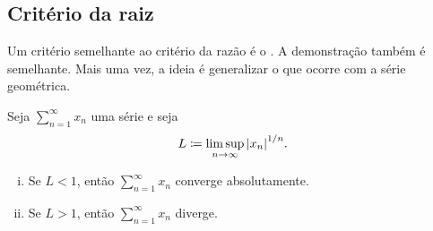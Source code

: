 

\subsection{Critério da raiz}

Um critério semelhante ao critério da razão é o
\emph{}. A demonstração também é semelhante.
Mais uma vez, a ideia é generalizar o que ocorre com a série geométrica.

\begin{prop}
Seja $\sum_{n=1}^\infty x_n$ uma série e seja
\begin{equation*}
L \coloneqq \limsup_{n\to\infty} {\lvert {x_n} \rvert}^{1/n} .
\end{equation*}
\begin{enumerate}[(i)]
\item Se $L < 1$, então $\sum_{n=1}^\infty x_n$ converge absolutamente.
\item Se $L > 1$, então $\sum_{n=1}^\infty x_n$ diverge.
\end{enumerate}
\end{prop}

